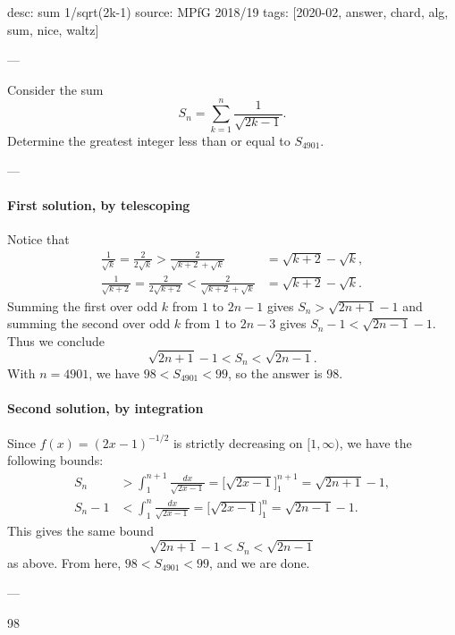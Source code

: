 desc: sum 1/sqrt(2k-1)
source: MPfG 2018/19
tags: [2020-02, answer, chard, alg, sum, nice, waltz]

---

Consider the sum \[S_n=\sum_{k=1}^n\frac1{\sqrt{2k-1}}.\]
Determine the greatest integer less than or equal to $S_{4901}$.

---

\paragraph{First solution, by telescoping}     Notice that
    \begin{align*}
        \frac1{\sqrt k}=\frac2{2\sqrt k}>\frac2{\sqrt{k+2}+\sqrt k}&=\sqrt{k+2}-\sqrt k,\\
        \frac1{\sqrt{k+2}}=\frac2{2\sqrt{k+2}}<\frac2{\sqrt{k+2}+\sqrt k}&=\sqrt{k+2}-\sqrt k.
    \end{align*}
    Summing the first over odd $k$ from $1$ to $2n-1$ gives $S_n>\sqrt{2n+1}-1$ and summing the second over odd $k$ from $1$ to $2n-3$ gives $S_n-1<\sqrt{2n-1}-1$. Thus we conclude \[\sqrt{2n+1}-1<S_n<\sqrt{2n-1}.\]
    With $n=4901$, we have $98<S_{4901}<99$, so the answer is $98$.

\paragraph{Second solution, by integration}     Since $f(x)=(2x-1)^{-1/2}$ is strictly decreasing on $[1,\infty)$, we have the following bounds:
    \begin{align*}
        S_n&>\int_1^{n+1}\frac{dx}{\sqrt{2x-1}}=\Big[\sqrt{2x-1}\Big]^{n+1}_1=\sqrt{2n+1}-1,\\
        S_n-1&<\int_1^n\frac{dx}{\sqrt{2x-1}}=\Big[\sqrt{2x-1}\Big]^n_1=\sqrt{2n-1}-1.
    \end{align*}
    This gives the same bound \[\sqrt{2n+1}-1<S_n<\sqrt{2n-1}\]
    as above. From here, $98<S_{4901}<99$, and we are done.


---

98
